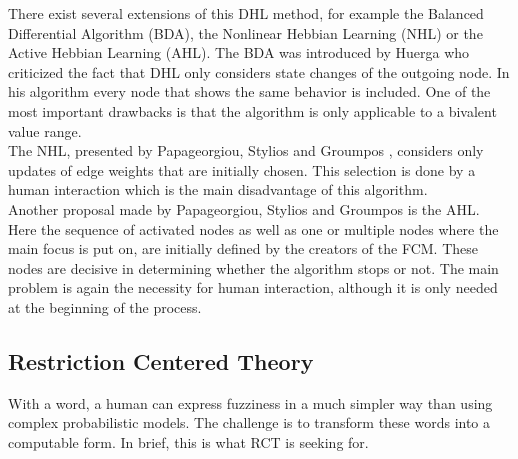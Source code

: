 \documentclass[conference]{IEEEtran}
\begin{document}
There exist several extensions of this DHL method, for example the Balanced Differential Algorithm (BDA), the Nonlinear Hebbian Learning (NHL) or the Active Hebbian Learning (AHL). The BDA was introduced by Huerga \cite{huerga2002} who criticized the fact that DHL only considers state changes of the outgoing node. In his algorithm every node that shows the same behavior is included. One of the most important drawbacks is that the algorithm is only applicable to a bivalent value range.\\
The NHL, presented by Papageorgiou, Stylios and Groumpos \cite{papageorgiou2003}, considers only updates of edge weights that are initially chosen. This selection is done by a human interaction which is the main disadvantage of this algorithm.\\
Another proposal made by Papageorgiou, Stylios and Groumpos \cite{papageorgiou2004} is the AHL. Here the sequence of activated nodes as well as one or multiple nodes where the main focus is put on, are initially defined by the creators of the FCM. These nodes are decisive in determining whether the algorithm stops or not. The main problem is again the necessity for human interaction, although it is only needed at the beginning of the process.

\subsection{Restriction Centered Theory}
With a word, a human can express fuzziness in a much simpler way than using complex probabilistic models. The challenge is to transform these words into a computable form. In brief, this is what RCT is seeking for.\\
\end{document}

